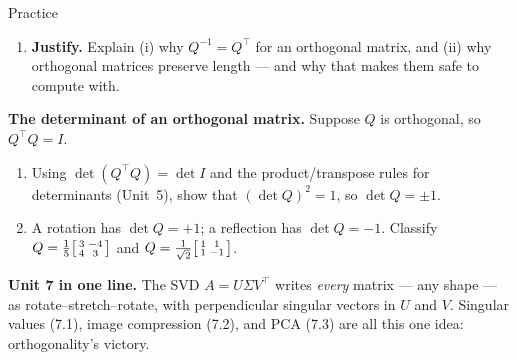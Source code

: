 \documentclass[10pt]{article}
\newcommand{\xx}{\mathbf{x}}
\newcommand{\T}{^{\top}}
\begin{document}
\begin{notesbox}{Practice}
\begin{enumerate}[leftmargin=1.9em, itemsep=12pt]
    \begin{enumerate}[label=(\alph*), leftmargin=1.8em, itemsep=3pt]
      \item Which factor does the stretching? Which factors only rotate?
      \item As $\xx$ ranges over unit vectors, what is the largest possible $|A\xx|$? The smallest?
    \end{enumerate}
    \vspace{1.7cm}
  \item \textbf{Justify.} Explain (i) why $Q^{-1}=Q\T$ for an orthogonal matrix, and (ii) why orthogonal matrices preserve length --- and why that makes them safe to compute with. 
\end{enumerate}
\end{notesbox}

\begin{extensionbox}
\textbf{The determinant of an orthogonal matrix.} Suppose $Q$ is orthogonal, so $Q\T Q=I$.
\begin{enumerate}[label=(\alph*), leftmargin=1.8em, itemsep=4pt]
  \item Using $\det(Q\T Q)=\det I$ and the product/transpose rules for determinants (Unit~5), show that $(\det Q)^2=1$, so $\det Q=\pm1$.
  \item A rotation has $\det Q=+1$; a reflection has $\det Q=-1$. Classify $Q=\tfrac15\begin{bsmallmatrix} 3 & -4\\ 4 & 3 \end{bsmallmatrix}$ and $Q=\tfrac1{\sqrt2}\begin{bsmallmatrix} 1 & 1\\ 1 & -1 \end{bsmallmatrix}$.
\end{enumerate}
\end{extensionbox}

\begin{spiralbox}
\textbf{Unit 7 in one line.} The SVD $A=U\Sigma V\T$ writes \emph{every} matrix --- any shape --- as
rotate--stretch--rotate, with perpendicular singular vectors in $U$ and $V$. Singular values (7.1), image
compression (7.2), and PCA (7.3) are all this one idea: orthogonality's victory.
\end{spiralbox}
\end{document}
